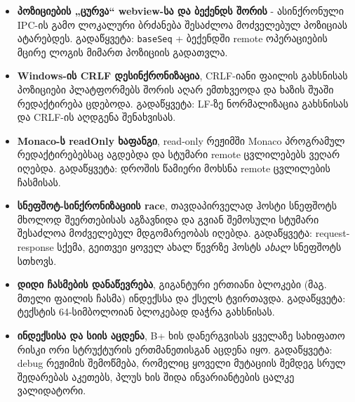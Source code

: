 \begin{itemize}[itemsep=2pt]
  \item \textbf{პოზიციების „ცურვა“ webview-სა და ბექენდს შორის} -
        ასინქრონული IPC-ის გამო ლოკალური ბრძანება შესაძლოა მოძველებულ
        პოზიციას ატარებდეს. გადაწყვეტა: \texttt{baseSeq} +
        ბექენდში remote ოპერაციების მცირე ლოგის მიმართ პოზიციის
        გადათვლა.
  \item \textbf{Windows-ის CRLF დესინქრონიზაცია}, CRLF-იანი ფაილის
        გახსნისას პოზიციები პლატფორმებს შორის აღარ ემთხვეოდა და
        ხაზის შუაში რედაქტირება ცდებოდა. გადაწყვეტა: LF-ზე ნორმალიზაცია
        გახსნისას და CRLF-ის აღდგენა შენახვისას.
  \item \textbf{Monaco-ს readOnly ხაფანგი}, read-only რეჟიმში Monaco
        პროგრამულ რედაქტირებებსაც აგდებდა და სტუმარი remote
        ცვლილებებს ვეღარ იღებდა. გადაწყვეტა: დროშის წამიერი მოხსნა
        remote ცვლილების ჩასმისას.
  \item \textbf{სნეფშოტ-სინქრონიზაციის race}, თავდაპირველად ჰოსტი
        სნეფშოტს მხოლოდ შეერთებისას აგზავნიდა და გვიან შემოსული სტუმარი
        შესაძლოა მოძველებულ მდგომარეობას იღებდა. გადაწყვეტა: request-
        response სქემა, გეითვეი ყოველ ახალ წევრზე ჰოსტს \emph{ახალ}
        სნეფშოტს სთხოვს.
  \item \textbf{დიდი ჩასმების დანაწევრება}, გიგანტური ერთიანი ბლოკები
        (მაგ. მთელი ფაილის ჩასმა) ინდექსსა და ქსელს ტვირთავდა.
        გადაწყვეტა: ტექსტის 64-სიმბოლოიან ბლოკებად დაჭრა გახსნისას.
  \item \textbf{ინდექსისა და სიის აცდენა}, B+ ხის დანერგვისას
        ყველაზე სახიფათო რისკი ორი სტრუქტურის ერთმანეთისგან აცდენა იყო.
        გადაწყვეტა: debug რეჟიმის შემოწმება, რომელიც ყოველი მუტაციის
        შემდეგ სრულ შედარებას აკეთებს, პლუს ხის შიდა ინვარიანტების ცალკე
        ვალიდატორი.
\end{itemize}
